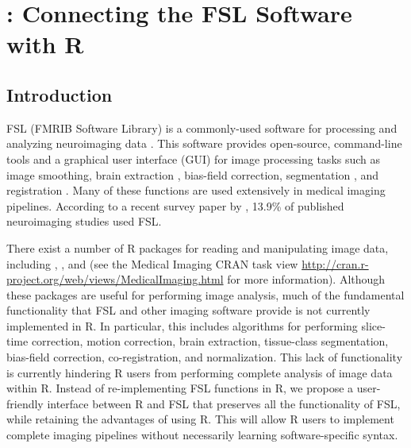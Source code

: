 \chapter{: Connecting the FSL Software with R}
\label{chap:fslr}
\section{Introduction}
\label{sec:intro}

FSL (FMRIB Software Library) is a commonly-used software for processing and analyzing neuroimaging data \citep{jenkinson_fsl_2012}.  This software provides open-source, command-line tools and a graphical user interface (GUI) for image processing tasks such as image smoothing, brain extraction \citep{smith_fast_2002}, bias-field correction, segmentation \citep{zhang_segmentation_2001}, and registration \citep{jenkinson_global_2001, jenkinson_improved_2002}.    Many of these functions are used extensively in medical imaging pipelines.   According to a recent survey paper by \citet{carp_secret_2012}, 13.9\% of published neuroimaging studies used FSL.

There exist a number of R packages for reading and manipulating image data, including  \citep{bordier_temporal_2011},  \citep{modat_rniftyreg:_2013}, and  \citep{tabelow_statistical_2011} (see the Medical Imaging CRAN task view \url{http://cran.r-project.org/web/views/MedicalImaging.html} for more information).  Although these packages are useful for performing image analysis, much of the fundamental functionality that FSL and other imaging software provide is not currently implemented in R.  In particular, this includes algorithms for performing slice-time correction, motion correction, brain extraction, tissue-class segmentation, bias-field correction, co-registration, and normalization. This lack of functionality is currently hindering R users from performing complete analysis of image data within R.  Instead of re-implementing FSL functions in R, we propose a user-friendly interface between R and FSL that preserves all the functionality of FSL, while retaining the advantages of using R.  This will allow
R users to implement complete imaging pipelines without necessarily learning software-specific syntax.  

